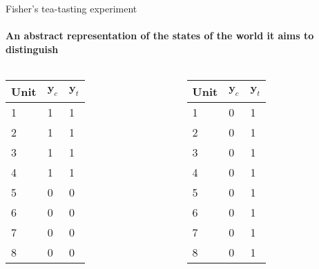 \begin{frame}{Fisher's tea-tasting experiment}

  \framesubtitle{An abstract representation of the states of the world
    it aims to distinguish}

\begin{columns}
    \begin{Column}

      \begin{tabular}{l|l|l}
    Unit & $\mathbf{y}_c$ & $\mathbf{y}_t$ \\ \hline
    1    & 1                & 1 \\
    2    & 1                & 1  \\
    3    & 1                & 1  \\
    4    & 1                & 1  \\
    5    & 0                & 0  \\
    6    & 0                & 0  \\
    7    & 0                & 0  \\
    8    & 0                & 0  \\
    \end{tabular}      
    \end{Column}
    \begin{Column}

\begin{tabular}{l|l|l}
    Unit & $\mathbf{y}_c$ & $\mathbf{y}_t$ \\ \hline
    1    & 0                & 1 \\
    2    & 0                & 1  \\
    3    & 0                & 1  \\
    4    & 0                & 1  \\
    5    & 0                & 1  \\
    6    & 0                & 1  \\
    7    & 0                & 1  \\
    8    & 0                & 1  \\
    \end{tabular}
    \end{Column}
\end{columns}
\end{frame}

